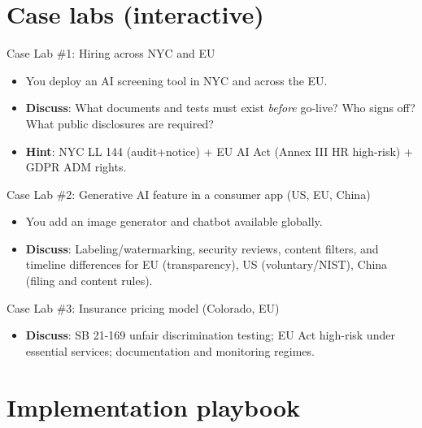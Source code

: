 \documentclass[aspectratio=169]{beamer}
\begin{document}
\section{Case labs (interactive)}

\begin{frame}{Case Lab \#1: Hiring across NYC and EU}
\begin{itemize}
  \item You deploy an AI screening tool in NYC and across the EU.
  \item \textbf{Discuss}: What documents and tests must exist \emph{before} go-live? Who signs off? What public disclosures are required?
  \item \textbf{Hint}: NYC LL 144 (audit+notice) + EU AI Act (Annex III HR high-risk) + GDPR ADM rights.
\end{itemize}
\end{frame}

\begin{frame}{Case Lab \#2: Generative AI feature in a consumer app (US, EU, China)}
\begin{itemize}
  \item You add an image generator and chatbot available globally.
  \item \textbf{Discuss}: Labeling/watermarking, security reviews, content filters, and timeline differences for EU (transparency), US (voluntary/NIST), China (filing and content rules).
\end{itemize}
\end{frame}

\begin{frame}{Case Lab \#3: Insurance pricing model (Colorado, EU)}
\begin{itemize}
  \item \textbf{Discuss}: SB 21-169 unfair discrimination testing; EU Act high-risk under essential services; documentation and monitoring regimes.
\end{itemize}
\end{frame}

\section{Implementation playbook}
\end{document}
